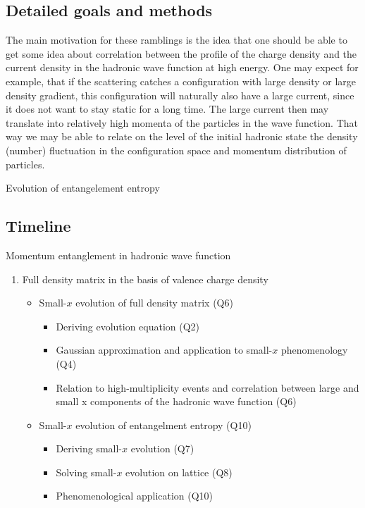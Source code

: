     \vspace{0.5em}
    \subsection{Detailed goals and methods}
        \label{sec:p21}
The main motivation for these ramblings is the idea that one should be able to get some idea about correlation
between the profile of the charge density and the current density in the hadronic wave function at high energy. One
may expect for example, that if the scattering catches a configuration with large density or large density gradient,
this configuration will naturally also have a large current, since it does not want to stay static for a long time. The
large current then may translate into relatively high momenta of the particles in the wave function. That way we
may be able to relate on the level of the initial hadronic state the density (number)
fluctuation in the configuration
space and momentum distribution of particles.


Evolution of entangelement entropy 


    \vspace{0.5em}
    \subsection{Timeline}
        \label{sec:p22}
  \item Momentum entanglement in hadronic wave function
        \begin{enumerate}
            \item Full density matrix  in the basis 
				of valence charge density
                \begin{itemize}
                    \item Small-$x$ evolution of full density matrix (Q6)
                        \begin{itemize}
                            \item Deriving evolution equation (Q2)
                            \item Gaussian approximation and application to small-$x$ 
								phenomenology (Q4)
                            \item Relation to high-multiplicity events and correlation between large and small x components of the hadronic  wave function (Q6)
                        \end{itemize}
                    \item  Small-$x$ evolution of entangelment entropy   (Q10)
                        \begin{itemize}
                            \item Deriving small-$x$ evolution (Q7)
                            \item Solving small-$x$ evolution on lattice (Q8)
                            \item Phenomenological application  (Q10)
                        \end{itemize}
                \end{itemize}
        \end{enumerate}

